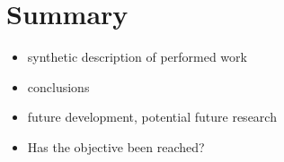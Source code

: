 \documentclass[a4paper,twoside,12pt]{book}
\begin{document}
%

\chapter{Summary}


\begin{itemize}
\item synthetic description of performed work
\item conclusions
\item  future development, potential future research
\item Has the objective been reached?
\end{itemize}
\end{document}
